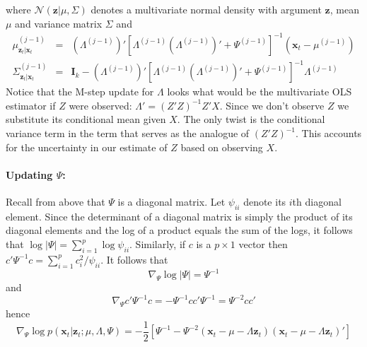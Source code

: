 \documentclass[12pt]{article}
\theoremstyle{definition}
\begin{document}
where $\mathcal{N}(\mathbf{z}|\mu, \Sigma)$ denotes a multivariate normal density with argument $\mathbf{z}$, mean $\mu$ and variance matrix $\Sigma$ and
	\begin{eqnarray*}
		\mu^{(j-1)}_{\mathbf{z}_t|\mathbf{x}_t} &=& \left(\Lambda^{(j-1)}\right)' \left[\Lambda^{(j-1)} \left(\Lambda^{(j-1)}\right)' + \Psi^{(j-1)}\right]^{-1} \left(\mathbf{x}_t - \mu^{(j-1)}\right) \\
		\Sigma^{(j-1)}_{\mathbf{z}_t|\mathbf{x}_t}  &=& \mathbf{I}_k - \left(\Lambda^{(j-1)}\right)' \left[\Lambda^{(j-1)} \left(\Lambda^{(j-1)}\right)' + \Psi^{(j-1)}\right]^{-1}\Lambda^{(j-1)}
	\end{eqnarray*}
Notice that the M-step update for $\Lambda$ looks what would be the multivariate OLS estimator if $Z$ were observed: $\Lambda' = (Z'Z)^{-1}Z'X$. Since we don't observe $Z$ we substitute its conditional mean given $X$. The only twist is the conditional variance term in the term that serves as the analogue of $(Z'Z)^{-1}$. This accounts for the uncertainty in our estimate of $Z$ based on observing $X$.

\paragraph{Updating $\Psi$:} Recall from above that $\Psi$ is a diagonal matrix. Let $\psi_{ii}$ denote its $i$th diagonal element. Since the determinant of a diagonal matrix is simply the product of its diagonal elements and the log of a product equals the sum of the logs, it follows that $\log |\Psi| = \sum_{i=1}^p \log \psi_{ii}$. Similarly, if $c$ is a $p\times 1$ vector then $c' \Psi^{-1} c = \sum_{i=1}^p c_i^2/\psi_{ii}$. It follows that 
	$$\nabla_\Psi \log |\Psi| = \Psi^{-1}$$
and
	$$\nabla_\Psi c' \Psi^{-1} c = - \Psi^{-1} cc' \Psi^{-1} = \Psi^{-2} cc'$$
hence
	$$ \nabla_\Psi \log p(\textbf{x}_t| \textbf{z}_t;\mu, \Lambda, \Psi) = -\frac{1}{2} \left[ \Psi^{-1} - \Psi^{-2}(\mathbf{x}_t - \mu -  \Lambda \textbf{z}_t)(\mathbf{x}_t - \mu -  \Lambda \textbf{z}_t)' \right]$$


\end{document}
